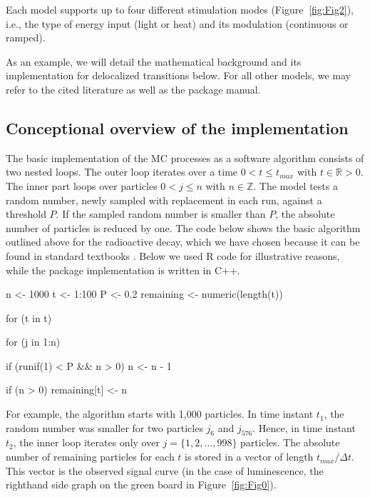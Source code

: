 Each model supports up to four different stimulation modes (Figure\(~\)
\ref{fig:Fig2}), i.e., the type of energy input (light or heat) and its
modulation (continuous or ramped).

As an example, we will detail the mathematical background and its
implementation for delocalized transitions below. For all other models,
we may refer to the cited literature as well as the package manual.

\hypertarget{conceptional-overview-of-the-implementation}{%
\subsection{Conceptional overview of the
implementation}\label{conceptional-overview-of-the-implementation}}

The basic implementation of the MC processes as a software algorithm
consists of two nested loops. The outer loop iterates over a time
\(0<t\leqslant t_{max}\) with \(t \in \mathbb{R} > 0\). The inner part
loops over particles \(0<j\leqslant n\) with \(n \in \mathbb{Z}\). The
model tests a random number, newly sampled with replacement in each run,
against a threshold \(P\). If the sampled random number is smaller than
\(P\), the absolute number of particles is reduced by one. The code
below shows the basic algorithm outlined above for the radioactive
decay, which we have chosen because it can be found in standard
textbooks \citep[e.g.,][]{Landau:2015vp}. Below we used R code for
illustrative reasons, while the package implementation is written in
C++.

\begin{Schunk}
\begin{Sinput}
n <- 1000
t <- 1:100
P <- 0.2
remaining <- numeric(length(t))

for (t in t) {
  for (j in 1:n) {
    if (runif(1) < P && n > 0)
      n <- n - 1
    
  }
  
  if (n > 0)
    remaining[t] <- n
  
}
\end{Sinput}
\end{Schunk}

For example, the algorithm starts with 1,000 particles. In time instant
\(t_1\), the random number was smaller for two particles \(j_6\) and
\(j_{576}\). Hence, in time instant \(t_2\), the inner loop iterates only
over \(j = \{1,2,...,998\}\) particles. The absolute number of remaining
particles for each \(t\) is stored in a vector of length
\(t_{max}/\Delta t\). This vector is the observed signal curve (in the
case of luminescence, the righthand side graph on the green board in
Figure\(~\) \ref{fig:Fig0}).

